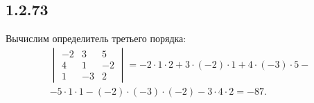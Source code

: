 \subsection{1.2.73}

Вычислим определитель третьего порядка:
\begin{multline*}
\begin{vmatrix}
	-2 & 3 & 5 \\
	4 & 1 & -2 \\
	1 & -3 & 2
\end{vmatrix}
=-2\cdot1\cdot2+3\cdot(-2)\cdot1+4\cdot(-3)\cdot5- \\
-5\cdot1\cdot1-(-2)\cdot(-3)\cdot(-2)-3\cdot4\cdot2=-87.
\end{multline*}